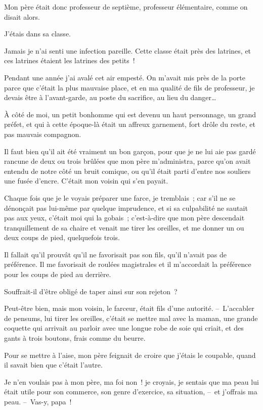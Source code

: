 \documentclass[french,twoside]{book} %
\begin{document}
\noindent Mon père était donc professeur de septième, professeur élémentaire, comme on disait alors.\par
J’étais dans sa classe.\par
Jamais je n’ai senti une infection pareille. Cette classe était près des latrines, et ces latrines étaient les latrines des petits !\par
Pendant une année j’ai avalé cet air empesté. On m’avait mis près de la porte parce que c’était la plus mauvaise place, et en ma qualité de fils de professeur, je devais être à l’avant-garde, au poste du sacrifice, au lieu du danger…\par
À côté de moi, un petit bonhomme qui est devenu un haut personnage, un grand préfet, et qui à cette époque-là était un affreux garnement, fort drôle du reste, et pas mauvais compagnon.\par
Il faut bien qu’il ait été vraiment un bon garçon, pour que je ne lui aie pas gardé rancune de deux ou trois brûlées que mon père m’administra, parce qu’on avait entendu de notre côté un bruit comique, ou qu’il était parti d’entre nos souliers une fusée d’encre. C’était mon voisin qui s’en payait.\par
Chaque fois que je le voyais préparer une farce, je tremblais ; car s’il ne se dénonçait pas lui-même par quelque imprudence, et si sa culpabilité ne sautait pas aux yeux, c’était moi qui la gobais ; c’est-à-dire que mon père descendait tranquillement de sa chaire et venait me tirer les oreilles, et me donner un ou deux coups de pied, quelquefois trois.\par
Il fallait qu’il prouvât qu’il ne favorisait pas son fils, qu’il n’avait pas de préférence. Il me favorisait de roulées magistrales et il m’accordait la préférence pour les coups de pied au derrière.\par
Souffrait-il d’être obligé de taper ainsi sur son rejeton ?\par
Peut-être bien, mais mon voisin, le farceur, était fils d’une autorité. – L’accabler de pensums, lui tirer les oreilles, c’était se mettre mal avec la maman, une grande coquette qui arrivait au parloir avec une longue robe de soie qui criait, et des gants à trois boutons, frais comme du beurre.\par
Pour se mettre à l’aise, mon père feignait de croire que j’étais le coupable, quand il savait bien que c’était l’autre.\par
Je n’en voulais pas à mon père, ma foi non ! je croyais, je sentais que ma peau lui était utile pour son commerce, son genre d’exercice, sa situation, – et j’offrais ma peau. – Vas-y, papa !\par
\end{document}
